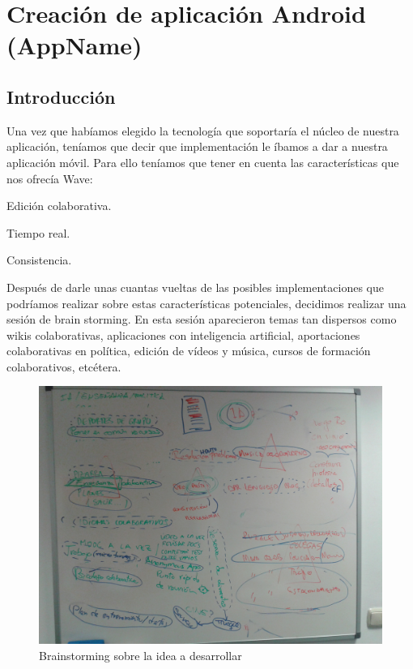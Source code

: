 \newpage
\thispagestyle{sectioned}
\chapter{Creación de aplicación Android (AppName)}

\section{Introducción}
Una vez que habíamos elegido la tecnología que soportaría el núcleo de nuestra aplicación, teníamos que decir que implementación le íbamos a dar a nuestra aplicación móvil. Para ello teníamos que tener en cuenta las características que nos ofrecía Wave:

Edición colaborativa.

Tiempo real.

Consistencia.

Después de darle unas cuantas vueltas de las posibles implementaciones que podríamos realizar sobre estas características potenciales, decidimos realizar una sesión de brain storming. En esta sesión aparecieron temas tan dispersos como wikis colaborativas, aplicaciones con inteligencia artificial, aportaciones colaborativas en política, edición de vídeos y música, cursos de formación colaborativos, etcétera.

	\begin{figure}[H]
      \centering
	\includegraphics[keepaspectratio, scale=0.15]{Media/Captures/brainstorming.jpg}
      \caption{Brainstorming sobre la idea a desarrollar}
      \label{fig:brainstorming}
    \end{figure}
    

